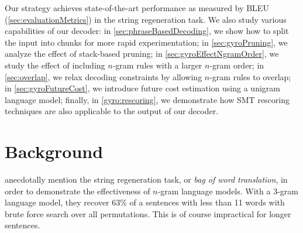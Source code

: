 Our strategy achieves state-of-the-art performance as
measured by BLEU (\autoref{sec:evaluationMetrics}) in the string regeneration
task. We also study various capabilities of our decoder: in
\autoref{sec:phraseBasedDecoding}, we show how to
split the input into chunks for more rapid experimentation;
in \autoref{sec:gyroPruning}, we analyze the effect of stack-based pruning;
in \autoref{sec:gyroEffectNgramOrder}, we study
the effect of including $n$-gram rules with a larger $n$-gram order;
in \autoref{sec:overlap}, we relax decoding constraints by allowing
$n$-gram rules to overlap; in \autoref{sec:gyroFutureCost}, we introduce
future cost estimation using a unigram language model; finally, in
\autoref{gyro:rescoring}, we demonstrate how SMT rescoring techniques
are also applicable to the output of our decoder.



\section{Background}
\label{sec:gyroBackground}


\citet{brown-cocke-dellapietra-dellapietra-jelinek-lafferty-mercer-roossin:1990:CL}
anecdotally mention the string regeneration task, or \emph{bag of word translation},
in order to demonstrate the effectiveness
of $n$-gram language models. With a 3-gram language model, they recover
63\% of a sentences with less than 11 words with brute force search
over all permutations. This is of course impractical for longer
sentences. %

